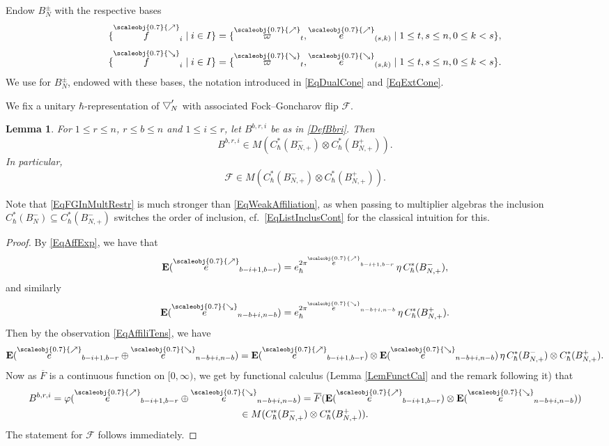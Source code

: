 \documentclass[11pt, reqno]{amsart}
\newtheorem{lemma}[theorem]{Lemma}
\theoremstyle{definition}
\numberwithin{equation}{section}
\newcommand{\Fct}{\mathcal{F}}
\newcommand{\Bor}{B}
\newcommand{\nears}{\scaleobj{0.7}{\nearrow}}
\newcommand{\sears}{\scaleobj{0.7}{\searrow}}
\newcommand{\nee}{\overset{\nears}{e}}
\newcommand{\seee}{\overset{\sears}{e}}
\newcommand{\nevarpi}{\overset{\nears}{\varpi}}
\newcommand{\sevarpi}{\overset{\sears}{\varpi}}
\newcommand{\nef}{\overset{\scaleobj{0.7}{\nearrow}}{f}}
\newcommand{\sef}{\overset{\scaleobj{0.7}{\searrow}}{f}}
\newcommand{\Eb}{\mathbf{E}}
\newcommand{\wbtd}[1]{\raisebox{\depth}{$\bigtriangledown'$\!\!}_{#1}}
\newcommand{\wwbtd}[1]{\Bor^-_{#1}}
\newcommand{\wwwbtd}[1]{\Bor^+_{#1}}
\begin{document}
Endow $\Bor_N^{\pm}$ with the respective bases
\begin{equation}
\{\nef_i \mid i \in I\} = \{\nevarpi_t,\nee_{(s,k)}\mid 1\leq t,s\leq n,0\leq k <s\},
\end{equation}
\begin{equation}
\{\sef_i \mid i \in I\} = \{\sevarpi_t,\seee_{(s,k)}\mid 1\leq t,s\leq n,0\leq k <s\}.
\end{equation}
We use for $\Bor_N^{\pm}$, endowed with these bases, the notation introduced in \eqref{EqDualCone} and \eqref{EqExtCone}. 

We fix a unitary $\hbar$-representation of $\wbtd{N}$ with associated Fock--Goncharov flip $\Fct$. 

\begin{lemma}\label{LemAffil}
For $1\leq r \leq n$, $r\leq b \leq n$ and $1\leq i\leq r$, let $B^{b,r,i}$ be as in \eqref{DefBbri}. Then
\[
B^{b,r,i} \in M(C_{\hbar}^*(\wwbtd{N,+})\otimes C_{\hbar}^*(\wwwbtd{N,+})).
\]
In particular,
\begin{equation}\label{EqFGInMultRestr}
\Fct \in M(C_{\hbar}^*(\wwbtd{N,+})\otimes C^*_{\hbar}(\wwwbtd{N,+})).
\end{equation}
\end{lemma}
Note that \eqref{EqFGInMultRestr} is much stronger than \eqref{EqWeakAffiliation}, as when passing to multiplier algebras the inclusion $C_{\hbar}^*(\wwbtd{N}) \subseteq C_{\hbar}^*(\wwbtd{N,+})$ switches the order of inclusion, cf.\ \eqref{EqListInclusCont} for the classical intuition for this.
\begin{proof}
By \eqref{EqAffExp}, we have that 
\[
\Eb(\nee_{b-i+1,b-r}) = e_{\hbar}^{2\pi \nee_{b-i+1,b-r}}\, \eta \, C_{\hbar}^*(\Bor_{N,+}^-),
\]
and similarly 
\[
\Eb(\seee_{n-b+i,n-b}) = e_{\hbar}^{2\pi \seee_{n-b+i,n-b}}\, \eta \, C_{\hbar}^*(\Bor_{N,+}^+).
\]
Then by the observation \eqref{EqAffiliTens}, we have 
\[
\Eb(\nee_{b-i+1,b-r}\oplus \seee_{n-b+i,n-b}) = \Eb(\nee_{b-i+1,b-r})\otimes \Eb(\seee_{n-b+i,n-b})\,\eta\,C_{\hbar}^*(\wwbtd{N,+})\otimes C^*_{\hbar}(\wwwbtd{N,+}). 
\]
Now as $\overline{F}$ is a continuous function on $[0,\infty)$, we get by functional calculus (Lemma \ref{LemFunctCal} and the remark following it) that 
\begin{multline*}
B^{b,r,i} = \varphi(\nee_{b-i+1,b-r}\oplus \seee_{n-b+i,n-b}) = \overline{F}(\Eb(\nee_{b-i+1,b-r})\otimes \Eb(\seee_{n-b+i,n-b}))\\  \in M(C_{\hbar}^*(\wwbtd{N,+})\otimes C^*_{\hbar}(\wwwbtd{N,+})).
\end{multline*}
The statement for $\Fct$ follows immediately.
\end{proof}
\end{document}
